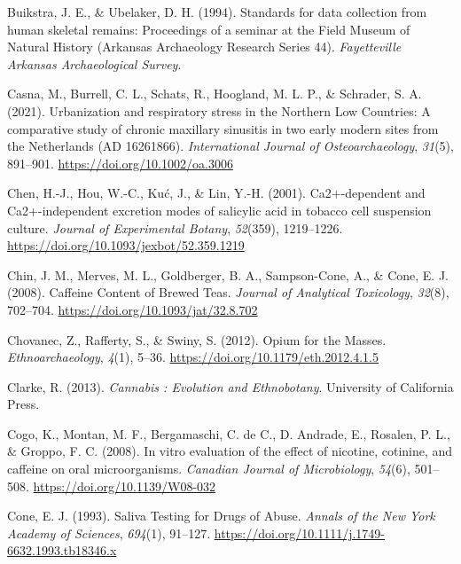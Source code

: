 \documentclass[
  b5paper,
]{book}
\newlength{\cslhangindent}
\newlength{\cslentryspacingunit} %
\newenvironment{CSLReferences}[2] %
 {%
  \setlength{\parindent}{0pt}
  \ifodd #1
  \let\oldpar\par
  \def\par{\hangindent=\cslhangindent\oldpar}
  \fi
  \setlength{\parskip}{#2\cslentryspacingunit}
 }%
 {}
\begin{document}
\begin{CSLReferences}{1}{0}
\leavevmode{}%
Buikstra, J. E., \& Ubelaker, D. H. (1994). Standards for data
collection from human skeletal remains: {Proceedings} of a seminar at
the {Field Museum} of {Natural History} ({Arkansas Archaeology Research
Series} 44). \emph{Fayetteville Arkansas Archaeological Survey}.

\leavevmode{}%
Casna, M., Burrell, C. L., Schats, R., Hoogland, M. L. P., \& Schrader,
S. A. (2021). Urbanization and respiratory stress in the {Northern Low
Countries}: {A} comparative study of chronic maxillary sinusitis in two
early modern sites from the {Netherlands} ({AD} 1626{\textendash}1866).
\emph{International Journal of Osteoarchaeology}, \emph{31}(5),
891--901. \url{https://doi.org/10.1002/oa.3006}

\leavevmode{}%
Chen, H.-J., Hou, W.-C., Kuć, J., \& Lin, Y.-H. (2001). Ca2+-dependent
and {Ca2}+-independent excretion modes of salicylic acid in tobacco cell
suspension culture. \emph{Journal of Experimental Botany},
\emph{52}(359), 1219--1226.
\url{https://doi.org/10.1093/jexbot/52.359.1219}

\leavevmode{}%
Chin, J. M., Merves, M. L., Goldberger, B. A., Sampson-Cone, A., \&
Cone, E. J. (2008). Caffeine {Content} of {Brewed Teas}. \emph{Journal
of Analytical Toxicology}, \emph{32}(8), 702--704.
\url{https://doi.org/10.1093/jat/32.8.702}

\leavevmode{}%
Chovanec, Z., Rafferty, S., \& Swiny, S. (2012). Opium for the {Masses}.
\emph{Ethnoarchaeology}, \emph{4}(1), 5--36.
\url{https://doi.org/10.1179/eth.2012.4.1.5}

\leavevmode{}%
Clarke, R. (2013). \emph{Cannabis : {Evolution} and {Ethnobotany}}.
{University of California Press}.

\leavevmode{}%
Cogo, K., Montan, M. F., Bergamaschi, C. de C., D. Andrade, E., Rosalen,
P. L., \& Groppo, F. C. (2008). In vitro evaluation of the effect of
nicotine, cotinine, and caffeine on oral microorganisms. \emph{Canadian
Journal of Microbiology}, \emph{54}(6), 501--508.
\url{https://doi.org/10.1139/W08-032}

\leavevmode{}%
Cone, E. J. (1993). Saliva {Testing} for {Drugs} of {Abuse}.
\emph{Annals of the New York Academy of Sciences}, \emph{694}(1),
91--127. \url{https://doi.org/10.1111/j.1749-6632.1993.tb18346.x}


\end{CSLReferences}
\end{document}
